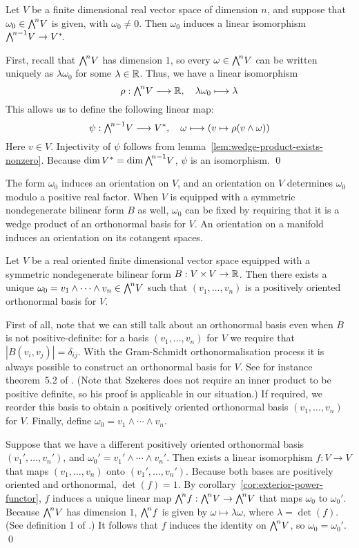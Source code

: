 Let $V$ be a finite dimensional real vector space of dimension $n$,
and suppose that $\omega_0 \in \Ln V$ is given,
with $\omega_0 \neq 0$.
Then $\omega_0$ induces a linear isomorphism
$\L{n-1} V \to V^*\!$.

\proof
First, recall that $\Ln V$ has dimension $1$,
so every $\omega \in \Ln V$ can be written uniquely as
$\lambda \omega_0$ for some $\lambda \in \R$.
Thus, we have a linear isomorphism
\[ \rho : \Ln V \longto \R,
   \quad \lambda \omega_0 \longmapsto \lambda \]
This allows us to define the following linear map:
\[ \psi : \L{n-1} V \longto V^*,
\quad \omega \longmapsto (v \mapsto \rho(v \wedge \omega)) \]
Here $v \in V\!$.
Injectivity of $\psi$ follows from lemma~\ref{lem:wedge-product-exists-nonzero}.
Because $\dim V^* = \dim \L{n-1} V$,
$\psi$ is an isomorphism.
\qed

The form $\omega_0$ induces an orientation on $V\!$,
and an orientation on $V$ determines $\omega_0$ modulo a positive real factor.
When $V$ is equipped with a symmetric nondegenerate bilinear form $B$ as well,
$\omega_0$ can be fixed by requiring that it is a wedge product of an orthonormal basis for $V\!$.
An orientation on a manifold induces an orientation on its cotangent spaces.

Let $V$ be a real oriented finite dimensional vector space
equipped with a symmetric nondegenerate bilinear form $B : V \times V \to \R$.
Then there exists a unique $\omega_0 = v_1 \wedge \cdots \wedge v_n \in \Ln V$
such that $(v_1, \ldots, v_n)$ is a positively oriented orthonormal basis for $V\!$.

\proof
First of all,
note that we can still talk about an orthonormal basis
even when $B$ is not positive-definite:
for a basis $(v_1, \ldots, v_n)$ for $V$ we require that
$|B(v_i, v_j)| = \delta_{i\!j}$.
With the Gram-Schmidt orthonormalisation process
it is always possible to construct an orthonormal basis for $V$.
See for instance theorem~5.2 of \parencite[p.~129]{szekeres2004}.
(Note that Szekeres does not require an inner product to be positive definite,
so his proof is applicable in our situation.)
If required, we reorder this basis to obtain a positively oriented orthonormal basis
$(v_1, \ldots, v_n)$ for $V\!$.
Finally, define $\omega_0 = v_1 \wedge \cdots \wedge v_n$.

Suppose that we have a different positively oriented orthonormal basis $(v_1', \ldots, v_n')$,
and $\omega_0' = v_1' \wedge \cdots \wedge v_n'$.
Then exists a linear isomorphism $f : V \to V$
that maps $(v_1, \ldots, v_n)$ onto $(v_1', \ldots, v_n')$.
Because both bases are positively oriented and orthonormal,
$\det(f) = 1$.
By corollary~\ref{cor:exterior-power-functor},
$f$ induces a unique linear map $\Ln f : \Ln V \to \Ln V$ that maps $\omega_0$ to $\omega_0'$.
Because $\Ln V$ has dimension $1$,
$\Ln f$ is given by $\omega \mapsto \lambda \omega$,
where $\lambda = \det(f)$.
(See definition 1 of \parencite[ch.~\textsc{iii}, \S~8.1]{bourbaki1970}.)
It follows that $f$ induces the identity on $\Ln V$,
so $\omega_0 = \omega_0'$.
\qed

